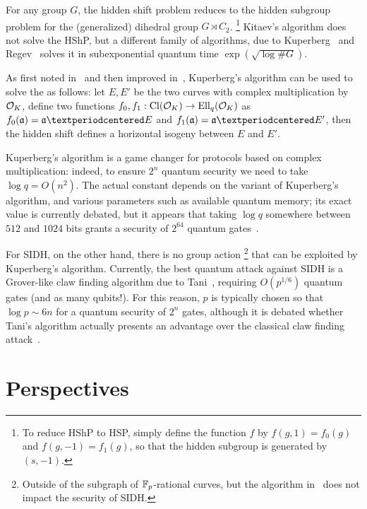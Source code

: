 \documentclass{report}
\theoremstyle{plain}
\theoremstyle{definition}
\begin{document}
For any group $G$, the hidden shift problem reduces to the hidden
subgroup problem for the (generalized) dihedral group $G\rtimes C_2$.%
\footnote{To reduce HShP to HSP, simply define the function $f$ by
  $f(g,1) = f_0(g)$ and $f(g,-1) = f_1(g)$, so that the hidden
  subgroup is generated by $(s,-1)$.} %
Kitaev's algorithm does not solve the HShP, but a different family of
algorithms, due to Kuperberg~\cite{Kup,Kuperberg2013} and
Regev~\cite{regev04} solves it in subexponential quantum time
$\exp(\sqrt{\log\#G})$. %

As first noted in~\cite{childs2014constructing} and then improved
in~\cite{BS18,BIJ18,Jao-etal-kuperberg-2018}, Kuperberg's algorithm
can be used to solve the  as follows: let $E,E'$ be
the two curves with complex multiplication by $\mathcal{O}_K$, define two
functions $f_0,f_1:\operatorname{Cl}(\mathcal{O}_K)\to\operatorname{Ell}_q(\mathcal{O}_K)$ as $f_0(\a)=\a·E$ and
$f_1(\a)=\a·E'$, then the hidden shift defines a horizontal isogeny
between $E$ and $E'$. %

Kuperberg's algorithm is a game changer for protocols based on complex
multiplication: indeed, to ensure $2^n$ quantum security we need to
take $\log q=O(n^2)$. %
The actual constant depends on the variant of Kuperberg's algorithm,
and various parameters such as available quantum memory; its exact
value is currently debated, but it appears that taking $\log q$
somewhere between $512$ and $1024$ bits grants a security of $2^{64}$
quantum gates~\cite{cryptoeprint:2018:383,cryptoeprint:2018:485,BS18}.

For SIDH, on the other hand, there is no group action%
\footnote{Outside of the subgraph of $\mathbb{F}_p$-rational curves, but the
  algorithm in~\cite{biasse2014quantum} does not impact the security
  of SIDH.} %
that can be exploited by Kuperberg's algorithm. %
Currently, the best quantum attack against SIDH is a Grover-like claw
finding algorithm due to Tani~\cite{tani2009claw}, requiring
$O(p^{1/6})$ quantum gates (and as many qubits!). %
For this reason, $p$ is typically chosen so that $\log p\sim 6n$ for a
quantum security of $2^n$ gates, although it is debated whether Tani's
algorithm actually presents an advantage over the classical claw
finding attack~\cite{todo}.


\section{Perspectives}
\end{document}
